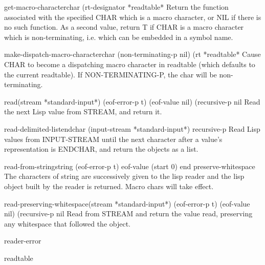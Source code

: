 \begin{function}{get-macro-character}{char \op (rt-designator *readtable*}{}
  Return the function associated with the specified CHAR which is a macro
  character, or NIL if there is no such function. As a second value, return
  T if CHAR is a macro character which is non-terminating, i.e. which can
  be embedded in a symbol name.
\end{function}

\begin{function}{make-dispatch-macro-character}{char \op (non-terminating-p nil) (rt *readtable*}{}
  Cause CHAR to become a dispatching macro character in readtable (which
   defaults to the current readtable). If NON-TERMINATING-P, the char will
   be non-terminating.
\end{function}

\begin{function}{read}{\op (stream *standard-input*) (eof-error-p t) (eof-value nil)
 (recursive-p nil}{}
  Read the next Lisp value from STREAM, and return it.
\end{function}

\begin{function}{read-delimited-list}{endchar \op (input-stream *standard-input*) recursive-p}{}
  Read Lisp values from INPUT-STREAM until the next character after a
   value's representation is ENDCHAR, and return the objects as a list.
\end{function}

\begin{function}{read-from-string}{string \op (eof-error-p t) eof-value \key (start 0) end
        preserve-whitespace}{}
  The characters of string are successively given to the lisp reader
   and the lisp object built by the reader is returned. Macro chars
   will take effect.
\end{function}

\begin{function}{read-preserving-whitespace}{\op (stream *standard-input*) (eof-error-p t) (eof-value nil)
 (recursive-p nil}{}
  Read from STREAM and return the value read, preserving any whitespace
   that followed the object.
\end{function}

\begin{condition-type}{reader-error}{}{}
  
\end{condition-type}

\begin{class}{readtable}{}{}
  
\end{class}

